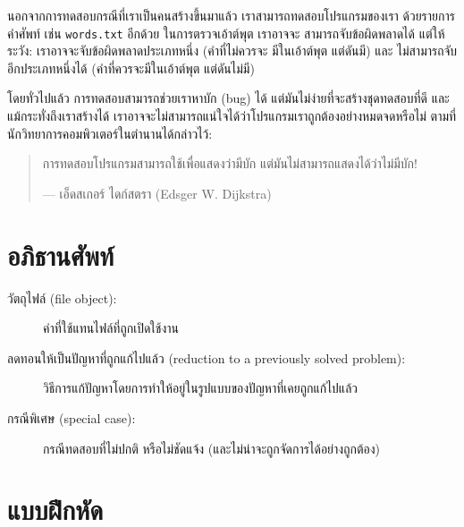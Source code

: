 นอกจากการทดสอบกรณีที่เราเป็นคนสร้างขึ้นมาแล้ว เราสามารถทดสอบโปรแกรมของเรา
ด้วยรายการคำศัพท์ เช่น {\tt words.txt} อีกด้วย ในการตรวจเอ้าต์พุต เราอาจจะ
สามารถจับข้อผิดพลาดได้  แต่ให้ระวัง: เราอาจจะจับข้อผิดพลาดประเภทหนึ่ง (คำที่ไม่ควรจะ
มีในเอ้าต์พุต แต่ดันมี) และ ไม่สามารถจับอีกประเภทหนึ่งได้ (คำที่ควรจะมีในเอ้าต์พุต แต่ดันไม่มี)

โดยทั่วไปแล้ว การทดสอบสามารถช่วยเราหาบัก (bug) ได้ แต่มันไม่ง่ายที่จะสร้างชุดทดสอบที่ดี
และแม้กระทั่งถึงเราสร้างได้ เราอาจจะไม่สามารถแน่ใจได้ว่าโปรแกรมเราถูกต้องอย่างหมดจดหรือไม่
ตามที่นักวิทยาการคอมพิวเตอร์ในตำนานได้กล่าวไว้:

\begin{quote}
การทดสอบโปรแกรมสามารถใช้เพื่อแสดงว่ามีบัก
แต่มันไม่สามารถแสดงได้ว่าไม่มีบัก!

--- เอ็ดสเกอร์ ไดก์สตรา (Edsger W. Dijkstra)
\end{quote}


\section{อภิธานศัพท์}

\begin{description}

\item[วัตถุไฟล์ (file object):] ค่าที่ใช้แทนไฟล์ที่ถูกเปิดใช้งาน

\item[ลดทอนให้เป็นปัญหาที่ถูกแก้ไปแล้ว (reduction to a previously solved problem):] 
วิธีการแก้ปัญหาโดยการทำให้อยู่ในรูปแบบของปัญหาที่เคยถูกแก้ไปแล้ว   

\item[กรณีพิเศษ (special case):] กรณีทดสอบที่ไม่ปกติ หรือไม่ชัดแจ้ง (และไม่น่าจะถูกจัดการได้อย่างถูกต้อง)

\end{description}


\section{แบบฝึกหัด}

